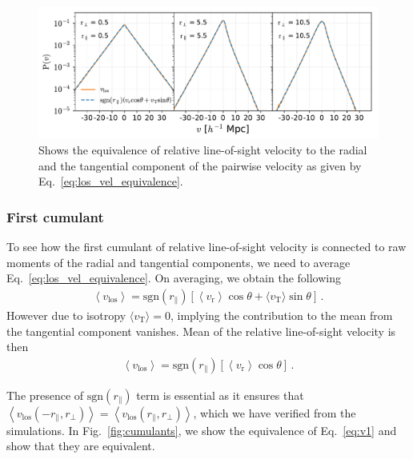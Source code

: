 \documentclass[a4paper,fleqn,usenatbib]{mnras}
\begin{document}
	
	\begin{figure}
		\centering
		\includegraphics[scale=0.9]{los_velrelation}
		\caption{Shows the equivalence of relative line-of-sight velocity to the radial and the tangential component of the pairwise velocity as given by Eq.~\ref{eq:los_vel_equivalence}.}
		\label{fig:los_relation}
	\end{figure}
	\subsubsection{First cumulant}
	
	To see how the first cumulant of relative line-of-sight velocity is connected to raw moments of the radial and tangential components, we need to average Eq.~\ref{eq:los_vel_equivalence}. On averaging, we obtain the following 
	\begin{eqnarray}
		\left\langle v_{\mathrm{los}}\right\rangle = \mathrm{sgn}(r_{\parallel}) \left[\left\langle v_{\mathrm{r}}\right\rangle \cos\theta + \langle v_{\mathrm{T}}\rangle\sin\theta\right] \, .
	\end{eqnarray}
	\noindent However due to isotropy $\langle v_{\mathrm{T}}\rangle = 0$, implying the contribution to the mean from the tangential component vanishes. Mean of the relative line-of-sight velocity is then
	\begin{eqnarray}\label{eq:v1}
		\left\langle v_{\mathrm{los}}\right\rangle = \mathrm{sgn}(r_{\parallel}) \left[\left\langle v_{\mathrm{r}}\right\rangle \cos\theta \right] \, .
	\end{eqnarray}	
	
	\noindent The presence of $ \mathrm{sgn}(r_{\parallel}) $ term is essential as it ensures that $\left\langle v_{\mathrm{los}}(-r_{\parallel},r_{\perp})\right\rangle = \left\langle v_{\mathrm{los}}(r_{\parallel},r_{\perp})\right\rangle$, which we have verified from the simulations. In Fig.~\ref{fig:cumulants}, we show the equivalence of Eq.~\ref{eq:v1} and show that they are equivalent.
\end{document}
